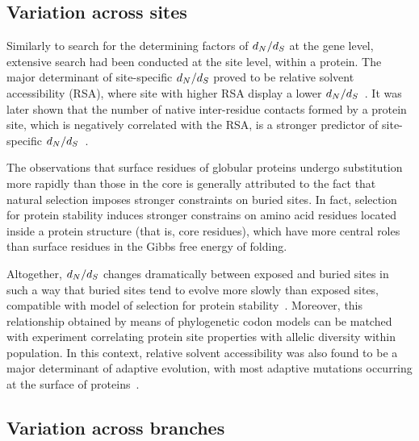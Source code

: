 \subsection{Variation across sites}

Similarly to search for the determining factors of $d_N / d_S$ at the gene level, extensive search had been conducted at the site level, within a protein.
The major determinant of site-specific $d_N / d_S$ proved to be relative solvent accessibility (RSA), where site with higher RSA display a lower $d_N / d_S$~\citep{Ramsey2011}.
It was later shown that the number of native inter-residue contacts formed by a protein site, which is negatively correlated with the RSA, is a stronger predictor of site-specific $d_N / d_S$~\citep{Yeh2013}.

The observations that surface residues of globular proteins undergo \gls{substitution} more rapidly than those in the core is generally attributed to the fact that natural selection imposes stronger constraints on buried sites.
In fact, selection for protein stability induces stronger constrains on amino acid residues located inside a protein structure (that is, core residues), which have more central roles than surface residues in the Gibbs free energy of folding.

Altogether, $d_N / d_S$ changes dramatically between exposed and buried sites in such a way that buried sites tend to evolve more slowly than exposed sites, compatible with model of selection for protein stability~\citep{Echave2016}.
Moreover, this relationship obtained by means of phylogenetic \gls{codon} models can be matched with experiment correlating protein site properties with allelic diversity within population.
In this context, relative solvent accessibility was also found to be a major determinant of adaptive evolution, with most adaptive mutations occurring at the surface of proteins~\citep{Moutinho2019}.

\subsection{Variation across branches}

